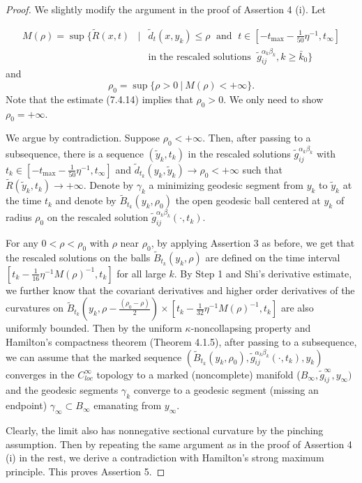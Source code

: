 \begin{proof}
We slightly modify the
argument in the proof of Assertion 4 (i). Let

\begin{eqnarray*}
M(\rho)=\sup\Big\{\widetilde{R}(x,t) &  |&
\tilde{d}_t(x,y_k)\leq\rho\; \mbox{ and }\; t \in
[-t_{\max}-\frac{1}{50}\eta^{-1},t_{\infty}]\\
&   &   \mbox{in the rescaled solutions } \;
\widetilde{g}^{\alpha_k\beta_k}_{ij}, k\geq \bar{k}_0 \Big\}
\end{eqnarray*}
and
$$
\rho_0=\sup\{\rho > 0\ |\  M(\rho)<+\infty\}.
$$
Note that the estimate (7.4.14) implies that $\rho_0>0$. We only
need to show $\rho_0 = +\infty$.

We argue by contradiction. Suppose $\rho_0<+\infty$. Then, after
passing to a subsequence, there is a sequence $(\tilde{y}_k,t_k)$
in the rescaled solutions $\widetilde{g}^{\alpha_k\beta_k}_{ij}$
with $t_k \in [-t_{\max}-\frac{1}{50}\eta^{-1},t_{\infty}]$ and
$\tilde{d}_{t_k}(y_k,\tilde{y}_k)\rightarrow\rho_0<+\infty$ such
that $\widetilde{R}(\tilde{y}_k,t_k)\rightarrow +\infty$. Denote
by $\gamma_k$ a minimizing geodesic segment from $y_k$ to
$\tilde{y}_k$ at the time $t_k$ and denote by
$\widetilde{B}_{t_k}(y_k,\rho_0)$ the open geodesic ball centered
at $y_k$ of radius $\rho_0$ on the rescaled solution
$\widetilde{g}^{\alpha_k\beta_k}_{ij}(\cdot,t_k)$.

For any $0<\rho<\rho_0$ with $\rho$ near $\rho_0$, by applying
Assertion 3 as before, we get that  the rescaled solutions on the
balls $\widetilde{B}_{t_k}(y_k,\rho)$ are defined on the time
interval $[t_k-\frac{1}{16}\eta^{-1}M(\rho)^{-1},t_k]$ for all
large $k$. By Step 1 and Shi's derivative estimate, we further
know that the covariant derivatives and higher order derivatives
of the curvatures on
$\widetilde{B}_{t_k}(y_k,\rho-\frac{(\rho_0-\rho)}{2})
\times[t_k-\frac{1}{32}\eta^{-1}M(\rho)^{-1},t_k]$ are also
uniformly bounded. Then by the uniform $\kappa$-noncollapsing
property and Hamilton's compactness theorem (Theorem 4.1.5), after
passing to a subsequence, we can assume that the marked sequence
$(\tilde{B}_{t_k}(y_k,\rho_0),\widetilde{g}^{\alpha_k\beta_k}_{ij}
(\cdot,t_k),y_k)$ converges in the $C^{\infty}_{loc}$ topology to
a marked (noncomplete) manifold
($B_{\infty},\widetilde{g}^{\infty}_{ij},y_{\infty})$ and the
geodesic segments $\gamma_k$ converge to a geodesic segment
(missing an endpoint) $\gamma_{\infty}\subset B_{\infty}$
emanating from $y_{\infty}$.

Clearly, the limit also has nonnegative sectional curvature by the
pinching assumption. Then by repeating the same argument as in the
proof of Assertion 4 (i) in the rest, we derive a contradiction
with Hamilton's strong maximum principle. This proves Assertion 5.
\end{proof}

